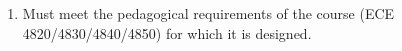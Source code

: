 \begin{itemize}
\begin{enumerate}
		
%
%		
		
		\item Must meet the pedagogical requirements of the course (ECE 4820/4830/4840/4850) for which it is designed.\\[.5cm] 
		
%
%		
		
	\end{enumerate}
\end{itemize}
%
%
%
%
%
